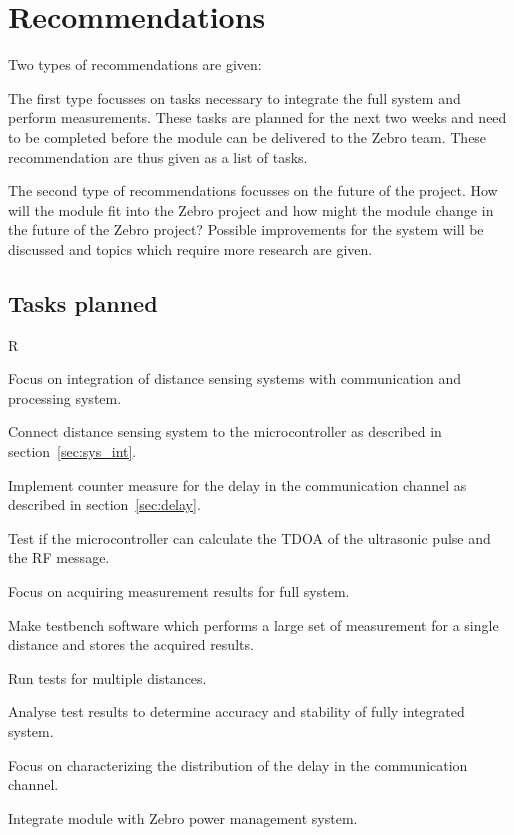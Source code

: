 \chapter{Recommendations}
\label{chap:recom}
Two types of recommendations are given:

The first type focusses on tasks necessary to integrate the full system and perform measurements.
These tasks are planned for the next two weeks and need to be completed before the module can be delivered to the Zebro team.
These recommendation are thus given as a list of tasks.

The second type of recommendations focusses on the future of the project.
How will the module fit into the Zebro project and how might the module change in the future of the Zebro project?
Possible improvements for the system will be discussed and topics which require more research are given.

\section{Tasks planned}

\begin{reqs}{R}
  \item
  Focus on integration of distance sensing systems with communication and processing system.
    \begin{subreqs}
      \item
      Connect distance sensing system to the microcontroller as described in section~\ref{sec:sys_int}.
      \item
      Implement counter measure for the delay in the communication channel as described in section~\ref{sec:delay}.
      \item
      Test if the microcontroller can calculate the TDOA of the ultrasonic pulse and the RF message.
    \end{subreqs}
  \item
  Focus on acquiring measurement results for full system.
    \begin{subreqs}
      \item
      Make testbench software which performs a large set of measurement for a single distance and stores the acquired results.
      \item
      Run tests for multiple distances.
      \item
      Analyse test results to determine accuracy and stability of fully integrated system.
    \end{subreqs}
  \item
  Focus on characterizing the distribution of the delay in the communication channel.
  \item
  Integrate module with Zebro power management system.
\end{reqs}

